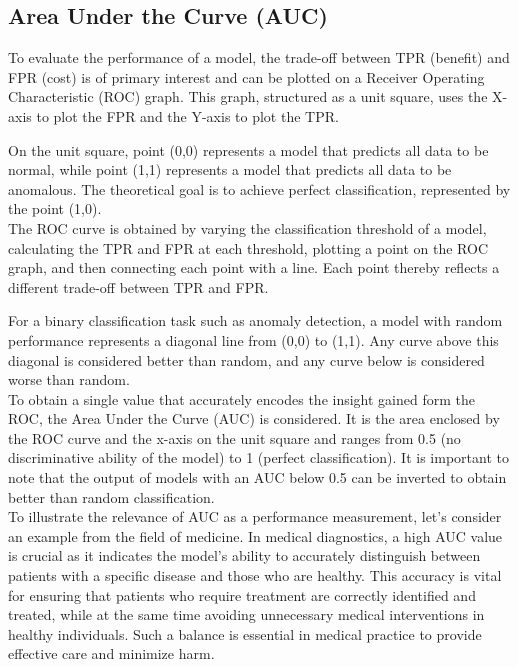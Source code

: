 \subsection{Area Under the Curve (AUC)}
To evaluate the performance of a model, the trade-off between TPR (benefit) and FPR (cost) is of primary interest and can be plotted on a Receiver Operating Characteristic (ROC) graph. This graph, structured as a unit square, uses the X-axis to plot the FPR and the Y-axis to plot the TPR.


On the unit square, point (0,0) represents a model that predicts all data to be normal, while point (1,1) represents a model that predicts all data to be anomalous. The theoretical goal is to achieve perfect classification, represented by the point (1,0). \\
The ROC curve is obtained by varying the classification threshold of a model, calculating the TPR and FPR at each threshold, plotting a point on the ROC graph, and then connecting each point with a line. Each point thereby reflects a different trade-off between TPR and FPR.


For a binary classification task such as anomaly detection, a model with random performance represents a diagonal line from (0,0) to (1,1). Any curve above this diagonal is considered better than random, and any curve below is considered worse than random. \\
To obtain a single value that accurately encodes the insight gained form the ROC, the Area Under the Curve (AUC) is considered. It is the area enclosed by the ROC curve and the x-axis on the unit square and ranges from 0.5 (no discriminative ability of the model) to 1 (perfect classification). It is important to note that the output of models with an AUC below 0.5 can be inverted to obtain better than random classification. \\
To illustrate the relevance of AUC as a performance measurement, let's consider an example from the field of medicine. In medical diagnostics, a high AUC value is crucial as it indicates the model's ability to accurately distinguish between patients with a specific disease and those who are healthy. This accuracy is vital for ensuring that patients who require treatment are correctly identified and treated, while at the same time avoiding unnecessary medical interventions in healthy individuals. Such a balance is essential in medical practice to provide effective care and minimize harm.

